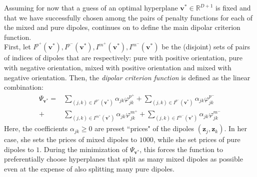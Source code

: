 \documentclass[12pt]{amsart}
\theoremstyle{definition}
\theoremstyle{plain}
\theoremstyle{remark}
\newcommand{\RR}{\mathbb{R}}
\begin{document}
Assuming for now that a guess of an optimal hyperplane $\mathbf{v}^\ast \in \RR^{D + 1}$ is fixed and that we have successfully chosen among the pairs of penalty functions for each of the mixed and pure dipoles, \cite{kretowska} continues on to define the main dipolar criterion function. \\

First, let $I^{p^+}(\mathbf{v}^\ast), I^{p^-}(\mathbf{v}^\ast), I^{m^+}(\mathbf{v}^\ast), I^{m^-}(\mathbf{v}^\ast)$ be the (disjoint) sets of pairs of indices of dipoles that are respectively: pure with positive orientation, pure with negative orientation, mixed with positive orientation and mixed with negative orientation. Then, the  \emph{dipolar criterion function} is defined as the linear combination:
\begin{align*}
	\Psi_{\mathbf{v}^\ast} = &\sum_{(j, k) \in I^{p^+}(\mathbf{v}^\ast)} \alpha_{jk} \varphi^{p^+}_{jk} + \sum_{(j, k) \in I^{p^-}(\mathbf{v}^\ast)} \alpha_{jk} \varphi^{p^-}_{jk} \\ 
	+ &\sum_{(j, k) \in I^{m^+}(\mathbf{v}^\ast)} \alpha_{jk} \varphi^{m^+}_{jk} + \sum_{(j, k) \in I^{m^-}(\mathbf{v}^\ast)} \alpha_{jk} \varphi^{m^-}_{jk}
\end{align*} Here, the coefficients $\alpha_{jk} \geq 0$ are preset ``prices" \cite{kretowska} of the dipoles $(\mathbf{z}_j, \mathbf{z}_k)$. In her case, she sets the prices of mixed dipoles to $1000$, while she set prices of pure dipoles to $1$. During the minimization of $\Psi_{\mathbf{v}^\ast}$, this forces the function to preferentially choose hyperplanes that split as many mixed dipoles as possible even at the expense of also splitting many pure  dipoles.







\end{document}
